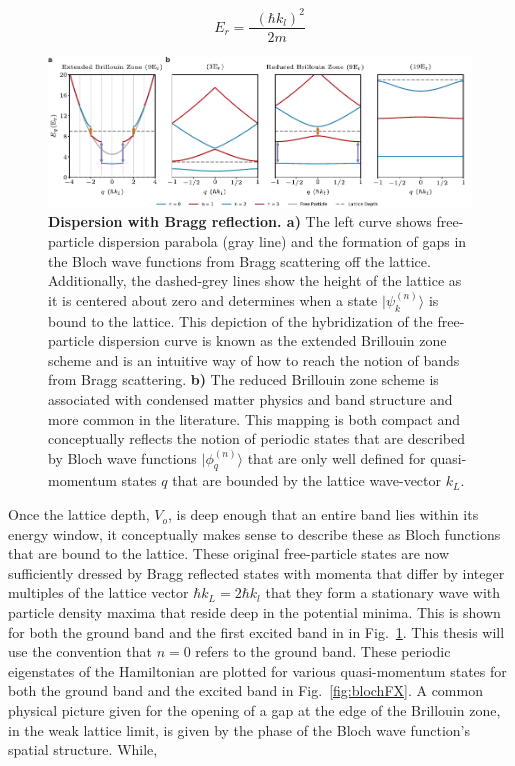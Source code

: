 \begin{equation}
E_r = \frac{~~(\hbar k_l)^2}{2 m}
\label{eqn:Er}
\end{equation}

\begin{figure}[t!]
		\includegraphics[width=\columnwidth]{figures/ch1/BandStructure/BZ_BS_v2_edit.pdf} 
		\caption{\textbf{Dispersion with Bragg reflection. a)} The left curve shows free-particle dispersion parabola (gray line) and the formation of gaps in the Bloch wave functions from Bragg scattering off the lattice. Additionally, the dashed-grey lines show the height of the lattice as it is centered about zero and determines when a state $| \psi_k^{(n)} \rangle$ is bound to the lattice. This depiction of the hybridization of the free-particle dispersion curve is known as the extended Brillouin zone scheme and is an intuitive way of how to reach the notion of bands from Bragg scattering. \textbf{b)} The reduced Brillouin zone scheme is associated with condensed matter physics and band structure and more common in the literature. This mapping is both compact and conceptually reflects the notion of periodic states that are described by Bloch wave functions $| \phi_q^{(n)} \rangle$ that are only well defined for quasi-momentum states $q$ that are bounded by the lattice wave-vector $k_L$.}
		\label{fig:freePartBS}	
\end{figure}

Once the lattice depth, $V_o$, is deep enough that an entire band lies within its energy window, it conceptually makes sense to describe these as Bloch functions that are bound to the lattice. These original free-particle states are now sufficiently dressed by Bragg reflected states with momenta that differ by integer multiples of the lattice vector $\hbar k_L=2\hbar k_l$ that they form a stationary wave with particle density maxima that reside deep in the potential minima. This is shown for both the ground band and the first excited band in in Fig.~\ref{fig:freePartBS}. This thesis will use the convention that $n=0$ refers to the ground band. These periodic eigenstates of the Hamiltonian are plotted for various quasi-momentum states for both the ground band and the excited band in Fig.~\ref{fig:blochFX}. A common physical picture given for the opening of a gap at the edge of the Brillouin zone, in the weak lattice limit, is given by the phase of the Bloch wave function's spatial structure. While,

